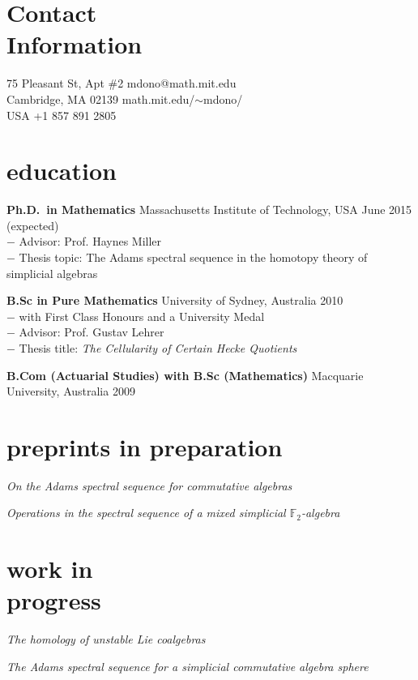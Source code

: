 \documentclass[margin,line]{resume}
\newcommand{\CVsection}[1]{\section{\mysidestyle #1}}
\newcommand{\entry}[3]{\textbf{#1} #2 \hfill {#3}
           
\vspace{-2.7mm}}
\newcommand{\twolineentry}[4]{\textbf{#1} #2 \hfill {#4}\\%
#3
           
\vspace{-2.7mm}}
\newcommand{\FINALentry}[3]{\textbf{#1} #2 \hfill {#3}}
\begin{document}
\name{\raisebox{.1cm}{\LARGE\sc Michael Jack Donovan}}
\begin{resume}


\CVsection{Contact\\Information}

75 Pleasant St, Apt \#2 \hfill {mdono@math.mit.edu}\\
Cambridge, MA  02139 \hfill {math.mit.edu/$\sim$mdono/}\\
USA \hfill +1 857 891 2805





\CVsection{education}

\twolineentry{Ph.D.\ in Mathematics}{Massachusetts Institute of Technology, USA}{%
\phantom{space}$-$ Advisor: Prof. Haynes Miller\\
\phantom{space}$-$ Thesis topic: The Adams spectral sequence in the homotopy theory of simplicial algebras%
}{June 2015 (expected)}
\twolineentry{B.Sc in Pure Mathematics}{University of Sydney, Australia}{%
\phantom{space}$-$ with First Class Honours and a University Medal\\
\phantom{space}$-$ Advisor: Prof. Gustav Lehrer\\
\phantom{space}$-$ Thesis title: \emph{The Cellularity of Certain Hecke Quotients}
}{2010}
\FINALentry{B.Com (Actuarial Studies) with B.Sc (Mathematics)}{Macquarie University, Australia}{2009}


\CVsection{preprints in preparation}

\entry{\hspace{-.275em}}{\emph{On the Adams spectral sequence for commutative algebras}}{}
\entry{\hspace{-.275em}}{\emph{Operations in the spectral sequence of a mixed simplicial $\mathbb{F}_2$-algebra}}{}


\CVsection{work in \\progress}

\entry{\hspace{-.275em}}{\emph{The homology of unstable Lie coalgebras}}{}
\FINALentry{\hspace{-.275em}}{\emph{The Adams spectral sequence for a simplicial commutative algebra
sphere}}{}



\end{resume}
\end{document}
